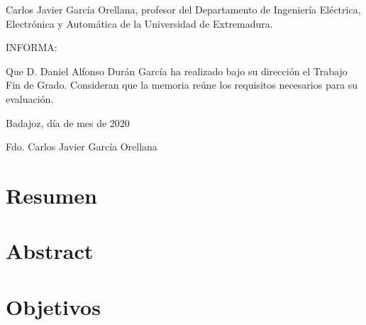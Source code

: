 \documentclass[12pt,dvipsnames,a4paper,twoside]{article}
\begin{document}


\shipout\null %

\pagestyle{empty}
\vspace*{5cm}

Carlos Javier García Orellana, profesor del
Departamento de Ingeniería Eléctrica, Electrónica y Automática de la Universidad de
Extremadura.

INFORMA:

Que D. Daniel Alfonso Durán García ha realizado
bajo su dirección el Trabajo Fin de Grado. Consideran que la memoria reúne
los requisitos necesarios para su evaluación.

\vspace*{1cm}
\begin{center}
Badajoz, día de mes de 2020


\vspace{5cm}
Fdo. Carlos Javier García Orellana
\end{center}

\newpage %
\setcounter{page}{1}
\pagestyle{plain}

\tableofcontents



\newpage
\section{Resumen}




\section{Abstract}




\newpage
\section{Objetivos}
\end{document}
